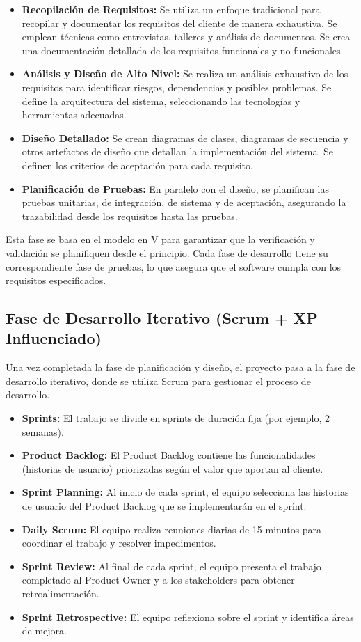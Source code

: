 \documentclass{article}
\begin{document}
\begin{itemize}
    \item \textbf{Recopilación de Requisitos:}  Se utiliza un enfoque tradicional para recopilar y documentar los requisitos del cliente de manera exhaustiva. Se emplean técnicas como entrevistas, talleres y análisis de documentos.  Se crea una documentación detallada de los requisitos funcionales y no funcionales.
    \item \textbf{Análisis y Diseño de Alto Nivel:}  Se realiza un análisis exhaustivo de los requisitos para identificar riesgos, dependencias y posibles problemas.  Se define la arquitectura del sistema, seleccionando las tecnologías y herramientas adecuadas.
    \item \textbf{Diseño Detallado:}  Se crean diagramas de clases, diagramas de secuencia y otros artefactos de diseño que detallan la implementación del sistema.  Se definen los criterios de aceptación para cada requisito.
    \item \textbf{Planificación de Pruebas:}  En paralelo con el diseño, se planifican las pruebas unitarias, de integración, de sistema y de aceptación, asegurando la trazabilidad desde los requisitos hasta las pruebas.
\end{itemize}

Esta fase se basa en el modelo en V para garantizar que la verificación y validación se planifiquen desde el principio. Cada fase de desarrollo tiene su correspondiente fase de pruebas, lo que asegura que el software cumpla con los requisitos especificados.

\subsection{Fase de Desarrollo Iterativo (Scrum + XP Influenciado)}

Una vez completada la fase de planificación y diseño, el proyecto pasa a la fase de desarrollo iterativo, donde se utiliza Scrum para gestionar el proceso de desarrollo.

\begin{itemize}
    \item \textbf{Sprints:} El trabajo se divide en sprints de duración fija (por ejemplo, 2 semanas).
    \item \textbf{Product Backlog:} El Product Backlog contiene las funcionalidades (historias de usuario) priorizadas según el valor que aportan al cliente.
    \item \textbf{Sprint Planning:} Al inicio de cada sprint, el equipo selecciona las historias de usuario del Product Backlog que se implementarán en el sprint.
    \item \textbf{Daily Scrum:} El equipo realiza reuniones diarias de 15 minutos para coordinar el trabajo y resolver impedimentos.
    \item \textbf{Sprint Review:} Al final de cada sprint, el equipo presenta el trabajo completado al Product Owner y a los stakeholders para obtener retroalimentación.
    \item \textbf{Sprint Retrospective:} El equipo reflexiona sobre el sprint y identifica áreas de mejora.
\end{itemize}
\end{document}
